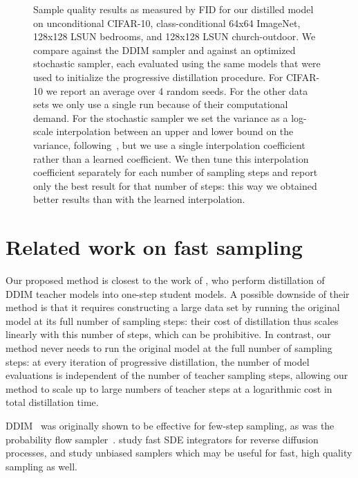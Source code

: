 \documentclass[hidelinks]{article} %
\begin{document}
\begin{figure}[htb]
\begin{minipage}[b]{.5\textwidth}
\end{minipage}
\caption{Sample quality results as measured by FID for our distilled model on unconditional CIFAR-10, class-conditional 64x64 ImageNet, 128x128 LSUN bedrooms, and 128x128 LSUN church-outdoor. We compare against the DDIM sampler and against an optimized stochastic sampler, each evaluated using the same models that were used to initialize the progressive distillation procedure. For CIFAR-10 we report an average over 4 random seeds. For the other data sets we only use a single run because of their computational demand. For the stochastic sampler we set the variance as a log-scale interpolation between an upper and lower bound on the variance, following~\citet{nichol2021improvedddpm}, but we use a single interpolation coefficient rather than a learned coefficient. We then tune this interpolation coefficient separately for each number of sampling steps and report only the best result for that number of steps: this way we obtained better results than with the learned interpolation.}
\label{fig:fid_plot}
\end{figure}
\section{Related work on fast sampling}
Our proposed method is closest to the work of \citet{luhman2021knowledge}, who perform distillation of DDIM teacher models into one-step student models. A possible downside of their method is that it requires constructing a large data set by running the original model at its full number of sampling steps: their cost of distillation thus scales linearly with this number of steps, which can be prohibitive. In contrast, our method never needs to run the original model at the full number of sampling steps: at every iteration of progressive distillation, the number of model evaluations is independent of the number of teacher sampling steps, allowing our method to scale up to large numbers of teacher steps at a logarithmic cost in total distillation time. 

DDIM~\citep{song2020denoising} was originally shown to be effective for few-step sampling, as was the probability flow sampler~\citep{song2020score}.
\citet{jolicoeur2021gotta} study fast SDE integrators for reverse diffusion processes, and 
\citet{tzen2019theoretical} study unbiased samplers which may be useful for fast, high quality sampling as well.
\end{document}
